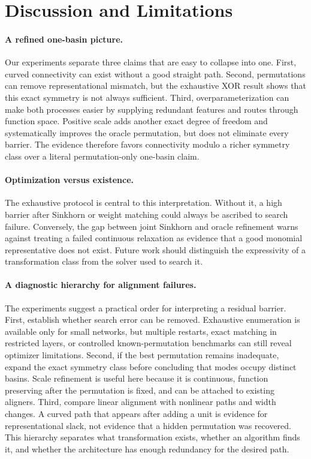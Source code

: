 \documentclass{article}
\begin{document}
\section{Discussion and Limitations}

\paragraph{A refined one-basin picture.}
Our experiments separate three claims that are easy to collapse into one.
First, curved connectivity can exist without a good straight path.  Second,
permutations can remove representational mismatch, but the exhaustive XOR
result shows that this exact symmetry is not always sufficient.  Third,
overparameterization can make both processes easier by supplying redundant
features and routes through function space.  Positive scale adds another exact
degree of freedom and systematically improves the oracle permutation, but does
not eliminate every barrier.  The evidence therefore favors connectivity
modulo a richer symmetry class over a literal permutation-only one-basin claim.

\paragraph{Optimization versus existence.}
The exhaustive protocol is central to this interpretation.  Without it, a high
barrier after Sinkhorn or weight matching could always be ascribed to search
failure.  Conversely, the gap between joint Sinkhorn and oracle refinement
warns against treating a failed continuous relaxation as evidence that a good
monomial representative does not exist.  Future work should distinguish the
expressivity of a transformation class from the solver used to search it.

\paragraph{A diagnostic hierarchy for alignment failures.}
The experiments suggest a practical order for interpreting a residual barrier.
First, establish whether search error can be removed.  Exhaustive enumeration
is available only for small networks, but multiple restarts, exact matching in
restricted layers, or controlled known-permutation benchmarks can still reveal
optimizer limitations.  Second, if the best permutation remains inadequate,
expand the exact symmetry class before concluding that modes occupy distinct
basins.  Scale refinement is useful here because it is continuous, function
preserving after the permutation is fixed, and can be attached to existing
aligners.  Third, compare linear alignment with nonlinear paths and width
changes.  A curved path that appears after adding a unit is evidence for
representational slack, not evidence that a hidden permutation was recovered.
This hierarchy separates what transformation exists, whether an algorithm finds
it, and whether the architecture has enough redundancy for the desired path.
\end{document}
